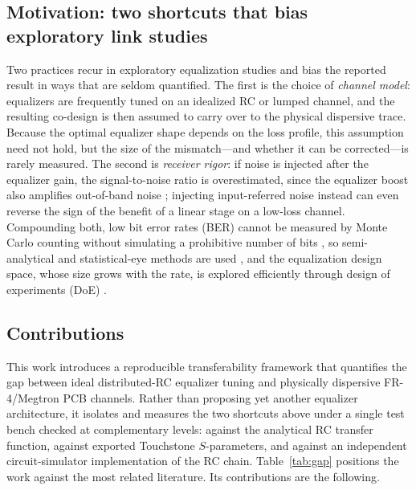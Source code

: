 \documentclass{ieeeaccess}
\begin{document}
\subsection{Motivation: two shortcuts that bias exploratory link studies}
Two practices recur in exploratory equalization studies and bias the
reported result in ways that are seldom quantified. The first is the choice
of \emph{channel model}: equalizers are frequently tuned on an idealized RC
or lumped channel, and the resulting co-design is then assumed to carry over
to the physical dispersive trace. Because the optimal equalizer shape
depends on the loss profile, this assumption need not hold, but the size of
the mismatch---and whether it can be corrected---is rarely measured. The
second is \emph{receiver rigor}: if noise is injected after the equalizer
gain, the signal-to-noise ratio is overestimated, since the equalizer boost
also amplifies out-of-band noise \cite{9707817}; injecting input-referred
noise instead can even reverse the sign of the benefit of a linear stage on
a low-loss channel. Compounding both, low bit error rates (BER) cannot be
measured by Monte Carlo counting without simulating a prohibitive number of
bits \cite{6248821}, so semi-analytical and statistical-eye methods are used
\cite{7202856,10415105}, and the equalization design space, whose size grows
with the rate, is explored efficiently through design of experiments (DoE)
\cite{7851249}.

\subsection{Contributions}
This work introduces a reproducible transferability framework that
quantifies the gap between ideal distributed-RC equalizer tuning and
physically dispersive FR-4/Megtron PCB channels. Rather than proposing yet
another equalizer architecture, it isolates and measures the two shortcuts
above under a single test bench checked at complementary levels: against the
analytical RC transfer function, against exported Touchstone
$S$-parameters, and against an independent circuit-simulator implementation
of the RC chain. Table~\ref{tab:gap} positions the work against the most
related literature. Its contributions are the following.
\end{document}
